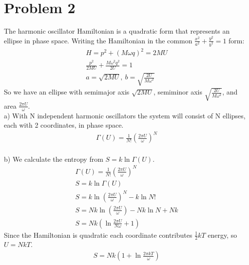\documentclass[a4paper,11pt]{article}
\numberwithin{equation}{section}
\begin{document}
\section{Problem 2}
The harmonic oscillator Hamiltonian is a quadratic form that represents an ellipse in phase space.
Writing the Hamiltonian in the common $\frac{x^2}{a^2}+\frac{y^2}{b^2}=1$ form:
\begin{gather}
 H=p^2+(M\omega q)^2=2MU\\
 \frac{p^2}{2MU}+\frac{M\omega^2q^2}{2U}=1\\
 a=\sqrt{2MU},\ b=\sqrt{\frac{2U}{M\omega^2}}
\end{gather}
So we have an ellipse with semimajor axis $\sqrt{2MU}$, semiminor axis $\sqrt{\frac{2U}{M\omega^2}}$, and area $\frac{2\pi U}{\omega}$.
\\
a) With N independent harmonic oscillators the system will consist of N ellipses, each with 2 coordinates, in phase space. 
\begin{gather}
 \Gamma (U) = \frac{1}{N!}\left(\frac{2\pi U}{\omega}\right)^N
\end{gather}
\\
b) We calculate the entropy from $S=k\ln{\Gamma (U)}$.
\begin{gather}
 \Gamma (U) = \frac{1}{N!}\left(\frac{2\pi U}{\omega}\right)^N\\
 S=k\ln{\Gamma (U)}\\
 S=k\ln{\left(\frac{2\pi U}{\omega}\right)^N}-k\ln{N!}\\
 S=Nk\ln{\left(\frac{2\pi U}{\omega}\right)}-Nk\ln{N}+Nk\\
 S=Nk\left(\ln{\frac{2\pi U}{N \omega}}+1\right)
\end{gather}
Since the Hamiltonian is quadratic each coordinate contributes $\frac{1}{2}kT$ energy, so $U=NkT$.
\begin{gather}
 S=Nk\left(1+\ln{\frac{2\pi kT}{\omega}}\right)
\end{gather}
\end{document}
